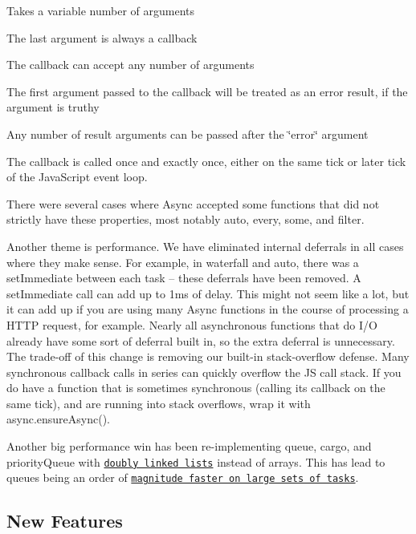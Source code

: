 \begin{DoxyEnumerate}
\item Takes a variable number of arguments
\item The last argument is always a callback
\item The callback can accept any number of arguments
\item The first argument passed to the callback will be treated as an error result, if the argument is truthy
\item Any number of result arguments can be passed after the \char`\"{}error\char`\"{} argument
\item The callback is called once and exactly once, either on the same tick or later tick of the Java\+Script event loop.
\end{DoxyEnumerate}

There were several cases where Async accepted some functions that did not strictly have these properties, most notably {\ttfamily auto}, {\ttfamily every}, {\ttfamily some}, and {\ttfamily filter}.

Another theme is performance. We have eliminated internal deferrals in all cases where they make sense. For example, in {\ttfamily waterfall} and {\ttfamily auto}, there was a {\ttfamily set\+Immediate} between each task -- these deferrals have been removed. A {\ttfamily set\+Immediate} call can add up to 1ms of delay. This might not seem like a lot, but it can add up if you are using many Async functions in the course of processing a H\+T\+TP request, for example. Nearly all asynchronous functions that do I/O already have some sort of deferral built in, so the extra deferral is unnecessary. The trade-\/off of this change is removing our built-\/in stack-\/overflow defense. Many synchronous callback calls in series can quickly overflow the JS call stack. If you do have a function that is sometimes synchronous (calling its callback on the same tick), and are running into stack overflows, wrap it with {\ttfamily async.\+ensure\+Async()}.

Another big performance win has been re-\/implementing {\ttfamily queue}, {\ttfamily cargo}, and {\ttfamily priority\+Queue} with \href{https://en.wikipedia.org/wiki/Doubly_linked_list}{\tt doubly linked lists} instead of arrays. This has lead to queues being an order of \href{https://github.com/caolan/async/pull/1205}{\tt magnitude faster on large sets of tasks}.

\subsection*{New Features}


